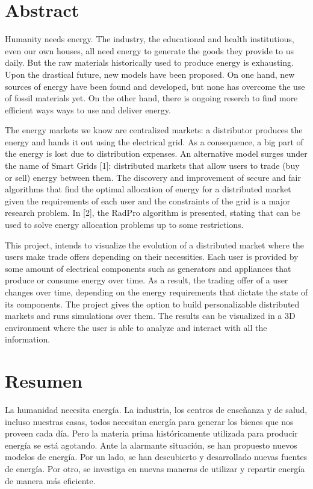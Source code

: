 \documentclass[12pt,a4paper,openright,oneside]{article}
\numberwithin{equation}{section}
\theoremstyle{definition}
\begin{document}
\newpage
{} 


\section*{Abstract}
Humanity needs energy. The industry, the educational and health institutious, even our own houses, all need energy to generate the goods they provide to us daily. But the raw materials historically used to produce energy is exhausting. Upon the drastical future, new models have been proposed. On one hand, new sources of energy have been found and developed, but none has overcome the use of fossil materials yet. On the other hand, there is ongoing reserch to find more efficient ways ways to use and deliver energy. 

The energy markets we know are centralized markets: a distributor produces the energy and hands it out using the electrical grid. As a consequence, a big part of the energy is lost due to distribution expenses. An alternative model surges under the name of Smart Grids [1]: distributed markets that allow users to trade (buy or sell) energy between them. The discovery and improvement of secure and fair algorithms that find the optimal allocation of energy for a distributed market given the requirements of each user and the constraints of the grid is a major research problem. In [2], the RadPro algorithm is presented, stating that can be used to solve energy allocation problems up to some restrictions.

This project, intends to visualize the evolution of a distributed market where the users make trade offers depending on their necessities. Each user is provided by some amount of electrical components such as generators and appliances that produce or consume energy over time. As a result, the trading offer of a user changes over time, depending on the energy requirements that dictate the state of its components. The project gives the option to build personalizable distributed markets and runs simulations over them. The results can be visualized in a 3D environment where the user is able to analyze and interact with all the information.

\section*{Resumen}

La humanidad necesita energía. La industria, los centros de enseñanza y de salud, incluso nuestras casas, todos necesitan energía para generar los bienes que nos proveen cada día. Pero la materia prima históricamente utilizada para producir energía se está agotando. Ante la alarmante situación, se han propuesto nuevos modelos de energía. Por un lado, se han descubierto y desarrollado nuevas fuentes de energía. Por otro, se investiga en nuevas maneras de utilizar y repartir energía de manera más eficiente.
\end{document}
